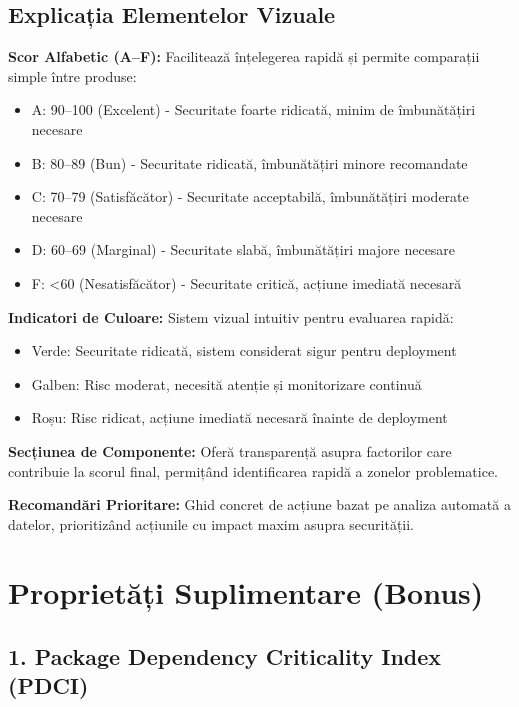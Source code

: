 \documentclass[12pt,a4paper]{article}
\begin{document}
\subsection{Explicația Elementelor Vizuale}

\textbf{Scor Alfabetic (A--F):} Facilitează înțelegerea rapidă și permite comparații simple între produse:

\begin{itemize}
\item A: 90--100 (Excelent) - Securitate foarte ridicată, minim de îmbunătățiri necesare
\item B: 80--89 (Bun) - Securitate ridicată, îmbunătățiri minore recomandate
\item C: 70--79 (Satisfăcător) - Securitate acceptabilă, îmbunătățiri moderate necesare
\item D: 60--69 (Marginal) - Securitate slabă, îmbunătățiri majore necesare
\item F: <60 (Nesatisfăcător) - Securitate critică, acțiune imediată necesară
\end{itemize}

\textbf{Indicatori de Culoare:} Sistem vizual intuitiv pentru evaluarea rapidă:

\begin{itemize}
\item Verde: Securitate ridicată, sistem considerat sigur pentru deployment
\item Galben: Risc moderat, necesită atenție și monitorizare continuă
\item Roșu: Risc ridicat, acțiune imediată necesară înainte de deployment
\end{itemize}

\textbf{Secțiunea de Componente:} Oferă transparență asupra factorilor care contribuie la scorul final, permițând identificarea rapidă a zonelor problematice.

\textbf{Recomandări Prioritare:} Ghid concret de acțiune bazat pe analiza automată a datelor, prioritizând acțiunile cu impact maxim asupra securității.

\section{Proprietăți Suplimentare (Bonus)}

\subsection{1. Package Dependency Criticality Index (PDCI)}
\end{document}

